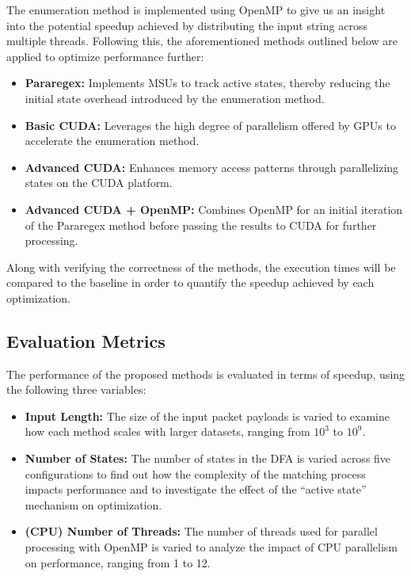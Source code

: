 \documentclass[sigconf]{acmart}
\begin{document}
The enumeration method is implemented using OpenMP to give us an insight into the potential speedup achieved by distributing the input string across multiple threads. Following this, the aforementioned methods outlined below are applied to optimize performance further:

\begin{itemize}
	\item \textbf{Pararegex:} Implements MSUs to track active states, thereby reducing the initial state overhead introduced by the enumeration method.
	\item \textbf{Basic CUDA:} Leverages the high degree of parallelism offered by GPUs to accelerate the enumeration method.
	\item \textbf{Advanced CUDA:} Enhances memory access patterns through parallelizing states on the CUDA platform.
	\item \textbf{Advanced CUDA + OpenMP:} Combines OpenMP for an initial iteration of the Pararegex method before passing the results to CUDA for further processing.
\end{itemize}

Along with verifying the correctness of the methods, the execution times will be compared to the baseline in order to quantify the speedup achieved by each optimization.

\subsection{Evaluation Metrics}

The performance of the proposed methods is evaluated in terms of speedup, using the following three variables:

\begin{itemize}
	\item \textbf{Input Length:} The size of the input packet payloads is varied to examine how each method scales with larger datasets, ranging from $10^3$ to $10^9$.
	\item \textbf{Number of States:} The number of states in the DFA is varied across five configurations to find out how the complexity of the matching process impacts performance and to investigate the effect of the ``active state'' mechanism on optimization.
	\item \textbf{(CPU) Number of Threads:} The number of threads used for parallel processing with OpenMP is varied to analyze the impact of CPU parallelism on performance, ranging from 1 to 12.
\end{itemize}
\end{document}

